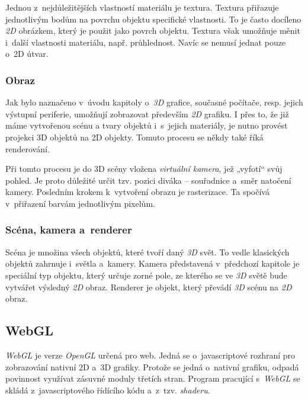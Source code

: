 \documentclass[a4paper,12pt]{article}
\begin{document}
Jednou z~nejdůležitějších vlastností materiálu je textura. Textura přiřazuje jednotlivým bodům na povrchu objektu specifické vlastnosti. To je často docíleno \textit{2D} obrázkem, který je použit jako povrch objektu. Textura však umožňuje měnit i~další vlastnosti materiálu, např. průhlednost. Navíc se nemusí jednat pouze o~2D útvar.~\cite{graphic}

\subsubsection{Obraz}

Jak bylo naznačeno v~úvodu kapitoly o~\textit{3D} grafice, současné počítače, resp. jejich výstupní periferie, umožňují zobrazovat především \textit{2D} grafiku. I přes to, že již máme vytvořenou scénu a tvary objektů i~s~jejich materiály, je nutno provést projekci 3D objektů na 2D objekty. Tomuto procesu se někdy také říká renderování.~\cite{graphic}

Při tomto procesu je do 3D scény vložena \textit{virtuální kamera}, jež „vyfotí“ svůj pohled. Je proto důležité určit tzv. pozici diváka -- souřadnice a~směr natočení kamery. Posledním krokem k~vytvoření obrazu je rasterizace. Ta spočívá v~přiřazení barvám jednotlivým pixelům.~\cite{graphic}

\subsubsection{Scéna, kamera a~renderer}

Scéna je množina všech objektů, které tvoří daný \textit{3D} svět. To vedle klasických objektů zahrnuje i~světla a~kamery. Kamera představená v~předchozí kapitole je speciální typ objektu, který určuje zorné pole, ze kterého se ve \textit{3D} světě bude vytvářet výsledný \textit{2D} obraz. Renderer je objekt, který převádí \textit{3D} scénu na \textit{2D} obraz.~\cite{graphic}


\subsection{WebGL}

\textit{WebGL} je verze \textit{OpenGL} určená pro web. Jedná se o~javascriptové rozhraní pro zobrazování nativní 2D a~3D grafiky. Protože se jedná o~nativní grafiku, odpadá povinnost využívat zásuvné moduly třetích stran. Program pracující s~\textit{WebGL} se skládá z~javascriptového řídícího kódu a~z~tzv. \textit{shaderu}.~\cite{graphic}
\end{document}
